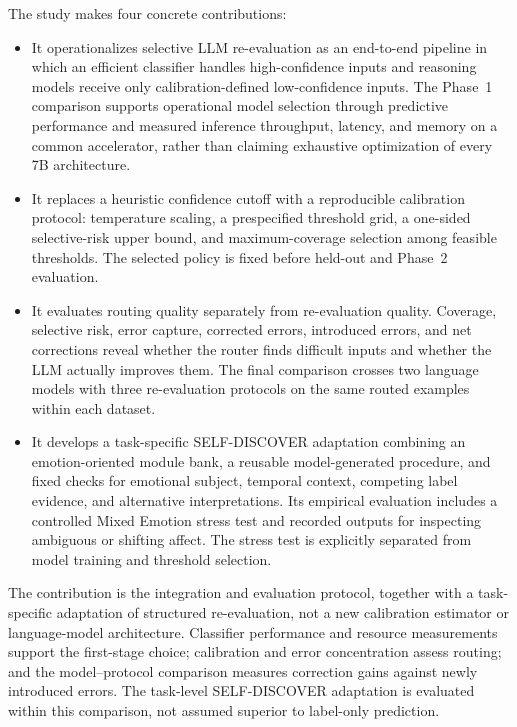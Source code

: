 \documentclass{ieeeaccess}
\begin{document}
The study makes four concrete contributions:
\begin{itemize}
\item It operationalizes selective LLM re-evaluation as an end-to-end pipeline in which an efficient classifier handles high-confidence inputs and reasoning models receive only calibration-defined low-confidence inputs. The Phase~1 comparison supports operational model selection through predictive performance and measured inference throughput, latency, and memory on a common accelerator, rather than claiming exhaustive optimization of every 7B architecture.
\item It replaces a heuristic confidence cutoff with a reproducible calibration protocol: temperature scaling, a prespecified threshold grid, a one-sided selective-risk upper bound, and maximum-coverage selection among feasible thresholds. The selected policy is fixed before held-out and Phase~2 evaluation.
\item It evaluates routing quality separately from re-evaluation quality. Coverage, selective risk, error capture, corrected errors, introduced errors, and net corrections reveal whether the router finds difficult inputs and whether the LLM actually improves them. The final comparison crosses two language models with three re-evaluation protocols on the same routed examples within each dataset.
\item It develops a task-specific SELF-DISCOVER adaptation \cite{ref18} combining an emotion-oriented module bank, a reusable model-generated procedure, and fixed checks for emotional subject, temporal context, competing label evidence, and alternative interpretations. Its empirical evaluation includes a controlled Mixed Emotion stress test and recorded outputs for inspecting ambiguous or shifting affect. The stress test is explicitly separated from model training and threshold selection.
\end{itemize}

The contribution is the integration and evaluation protocol, together with a task-specific adaptation of structured re-evaluation, not a new calibration estimator or language-model architecture.
Classifier performance and resource measurements support the first-stage choice; calibration and error concentration assess routing; and the model--protocol comparison measures correction gains against newly introduced errors. The task-level SELF-DISCOVER adaptation is evaluated within this comparison, not assumed superior to label-only prediction.
\end{document}
